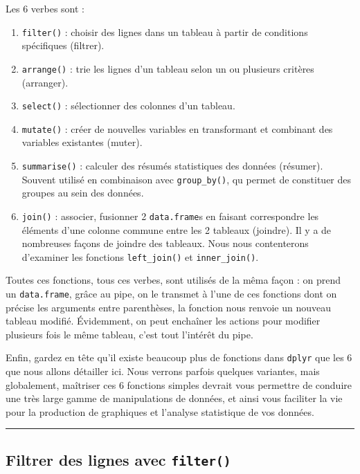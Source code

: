 \documentclass[a4paperpaper,]{article}
\providecommand{\tightlist}{%
  \setlength{\itemsep}{0pt}\setlength{\parskip}{0pt}}
\theoremstyle{definition}
\theoremstyle{definition}
\theoremstyle{definition}
\theoremstyle{remark}
\begin{document}
Les 6 verbes sont :

\begin{enumerate}
\def\labelenumi{\arabic{enumi}.}
\tightlist
\item
  \texttt{filter()} : choisir des lignes dans un tableau à partir de
  conditions spécifiques (filtrer).
\item
  \texttt{arrange()} : trie les lignes d'un tableau selon un ou
  plusieurs critères (arranger).
\item
  \texttt{select()} : sélectionner des colonnes d'un tableau.
\item
  \texttt{mutate()} : créer de nouvelles variables en transformant et
  combinant des variables existantes (muter).
\item
  \texttt{summarise()} : calculer des résumés statistiques des données
  (résumer). Souvent utilisé en combinaison avec \texttt{group\_by()},
  qu permet de constituer des groupes au sein des données.
\item
  \texttt{join()} : associer, fusionner 2 \texttt{data.frame}s en
  faisant correspondre les éléments d'une colonne commune entre les 2
  tableaux (joindre). Il y a de nombreuses façons de joindre des
  tableaux. Nous nous contenterons d'examiner les fonctions
  \texttt{left\_join()} et \texttt{inner\_join()}.
\end{enumerate}

Toutes ces fonctions, tous ces verbes, sont utilisés de la mêma façon :
on prend un \texttt{data.frame}, grâce au pipe, on le transmet à l'une
de ces fonctions dont on précise les arguments entre parenthèses, la
fonction nous renvoie un nouveau tableau modifié. Évidemment, on peut
enchaîner les actions pour modifier plusieurs fois le même tableau,
c'est tout l'intérêt du pipe.

Enfin, gardez en tête qu'il existe beaucoup plus de fonctions dans
\texttt{dplyr} que les 6 que nous allons détailler ici. Nous verrons
parfois quelques variantes, mais globalement, maîtriser ces 6 fonctions
simples devrait vous permettre de conduire une très large gamme de
manipulations de données, et ainsi vous faciliter la vie pour la
production de graphiques et l'analyse statistique de vos données.

\begin{center}\rule{0.5\linewidth}{\linethickness}\end{center}

\hypertarget{filtrer-des-lignes-avec-filter}{%
\subsection{\texorpdfstring{Filtrer des lignes avec
\texttt{filter()}}{Filtrer des lignes avec filter()}}\label{filtrer-des-lignes-avec-filter}}
\end{document}
